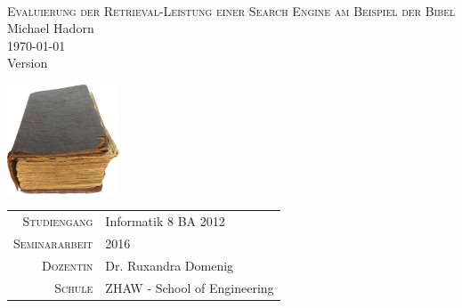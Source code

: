 




\begin{titlepage}
	\mbox{}\vspace{5\baselineskip}\\
	\rmfamily\huge
	\centering
	\textsc{Evaluierung der Retrieval-Leistung einer Search Engine am Beispiel der Bibel} \\
	
	\vspace{2em}
	Michael Hadorn\\
	\vspace{\baselineskip}
	\rmfamily\Large
	\today\\
	Version \mbox{} \\
	\normalsize
	
	\vspace{7em}
	\includegraphics[width=0.25\textwidth]{images/0-title/bible.png}
	
	\vfill

	\begin{center}
		\begin{tabular}[h]{ r l }
			\textsc{\small{Studiengang}} & Informatik 8 BA 2012\\
			\textsc{\small{Seminararbeit}} & 2016\\
			\textsc{\small{Dozentin}} & Dr. Ruxandra Domenig\\
			\textsc{\small{Schule}} & ZHAW - School of Engineering\\
		\end{tabular}
	\end{center}

\end{titlepage}

